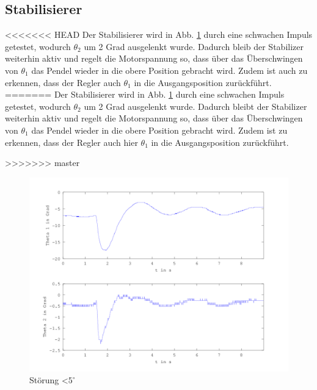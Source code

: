 \subsection{Stabilisierer}

<<<<<<< HEAD
Der Stabilisierer wird in Abb. \ref{fig.Stabilisierer-Plot} durch eine schwachen Impuls getestet, wodurch $\theta_2$ um 2 Grad ausgelenkt wurde. Dadurch bleib der Stabilizer weiterhin aktiv und regelt die Motorspannung so, dass über das Überschwingen von $ \theta_1$ das Pendel wieder in die obere Position gebracht wird. Zudem ist auch zu erkennen, dass der Regler auch $ \theta_1$ in die Ausgangsposition zurückführt.
=======
Der Stabilisierer wird in Abb. \ref{fig.Stabilisierer-Plot} durch eine schwachen Impuls getestet, wodurch $\theta_2$ um 2 Grad ausgelenkt wurde. Dadurch bleibt der Stabilizer weiterhin aktiv und regelt die Motorspannung so, dass über das Überschwingen von $ \theta_1$ das Pendel wieder in die obere Position gebracht wird. Zudem ist zu erkennen, dass der Regler auch hier $ \theta_1$ in die Ausgangsposition zurückführt.

>>>>>>> master
\begin{figure}[htbp]
	\centering
	\includegraphics[width=1.\textwidth]{Grafiken/Stab_lang.png}
	\caption{Störung \textless $5^{\circ}$}
	\label{fig.Stabilisierer-Plot}
\end{figure}



